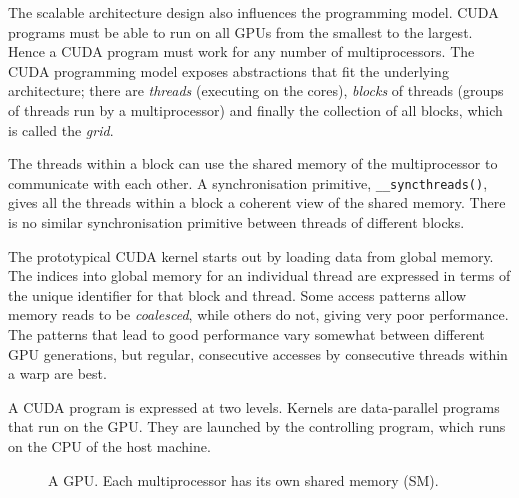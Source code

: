The scalable architecture design also influences the programming model. CUDA 
programs must be able to run on all GPUs from the smallest to the largest.
Hence a CUDA program must work for any number of  multiprocessors.
The CUDA programming model exposes abstractions that fit the underlying 
architecture; there are {\em threads} (executing on the cores), {\em blocks} 
of threads (groups of threads run by a multiprocessor) and finally 
the collection of all blocks, which is called the {\em grid}.

The threads within a block can use the shared memory of the multiprocessor 
to communicate with each other. A synchronisation primitive, {\tt \_\_syncthreads()}, 
gives all the threads within a block a coherent view of the shared memory. 
There is no similar synchronisation primitive between threads of different blocks.

The prototypical CUDA kernel starts out by loading data from global memory.
The indices into global memory for an individual thread are expressed
in terms of the unique identifier for that block and thread.
Some access patterns allow memory reads to be \emph{coalesced}, while others 
do not, giving very poor performance. The patterns that lead to good performance 
vary somewhat between different GPU generations, but regular, consecutive accesses 
by consecutive threads within a warp are best.

 
A CUDA program is expressed at two levels. Kernels are data-parallel programs 
that run on the GPU. They are launched by the controlling program, which runs 
on the CPU of the host machine. 


\begin{figure} 
\def\s{.75}
\caption{ A GPU. Each multiprocessor has its own shared memory (SM). } 
\label{fig:GPU}
\end{figure}


